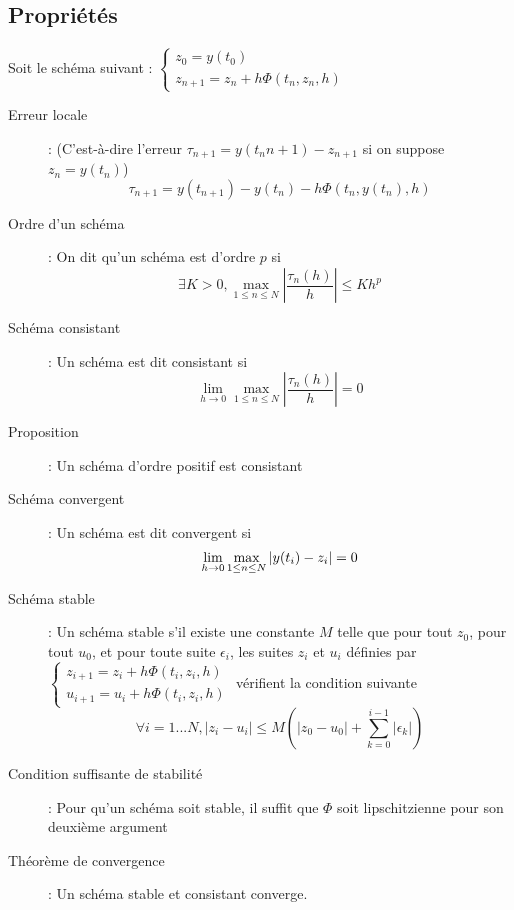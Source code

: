\subsection{Propriétés}
Soit le schéma suivant : $\begin{cases}
z_0=y(t_0)\\
z_{n+1} = z_n + h\Phi(t_n,z_n,h)
\end{cases}$
\begin{description}
\item[Erreur locale] : (C'est-à-dire l'erreur $\tau_{n+1}=y(t_n{n+1})-z_{n+1}$ si on suppose $z_n=y(t_n)$)
    \[
        \tau_{n+1} = y(t_{n+1}) - y(t_n) - h\Phi(t_n, y(t_n), h)
    \]
\item[Ordre d'un schéma] : On dit qu'un schéma est d'ordre $p$ si
    \[
        \exists K > 0, \max_{1\le n \le N}\left| \frac{\tau_n(h)}{h} \right| \le Kh^p
    \]
\item[Schéma consistant] : Un schéma est dit consistant si
    \[
        \lim_{h\rightarrow 0}\max_{1\le n \le N}\left| \frac{\tau_n(h)}{h} \right| = 0
    \]
\item[Proposition] : Un schéma d'ordre positif est consistant
\item[Schéma convergent] : Un schéma est dit convergent si
    \[
        \lim_{h\rightarrow0}\max_{1\le n\le N} | y(t_i) - z_i | = 0
    \]
\item[Schéma stable] : Un schéma stable s'il existe une constante $M$ telle que pour tout $z_0$, pour tout $u_0$, et pour toute suite $\epsilon_i$, les suites
$z_i$ et $u_i$ définies par $\begin{cases}
    z_{i+1} = z_i + h\Phi(t_i,z_i,h) \\
    u_{i+1} = u_i + h\Phi(t_i, z_i, h)
\end{cases}$
    vérifient la condition suivante
    \[
        \forall i=1...N, | z_i - u_i |\le M\left( |z_0-u_0| + \sum_{k=0}^{i-1}|\epsilon_k| \right)
    \]
\item[Condition suffisante de stabilité] : Pour qu'un schéma soit stable, il suffit que $\Phi$ soit lipschitzienne pour son deuxième argument
\item[Théorème de convergence] : Un schéma stable et consistant converge.
\end{description}